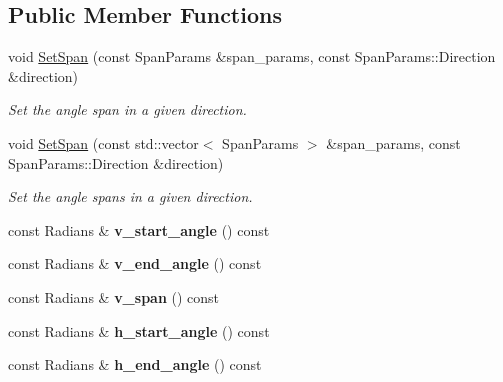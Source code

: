 \subsection*{Public Member Functions}
\begin{DoxyCompactItemize}
\item 
void \hyperlink{classdepth__clustering_1_1ProjectionParams_a0348997a7db34e534270d9a71619b8a9}{Set\+Span} (const Span\+Params \&span\+\_\+params, const Span\+Params\+::\+Direction \&direction)
\begin{DoxyCompactList}\small\item\em Set the angle span in a given direction. \end{DoxyCompactList}\item 
void \hyperlink{classdepth__clustering_1_1ProjectionParams_a6b21f0b17b1b1d38f8cb5b6990b4b0ec}{Set\+Span} (const std\+::vector$<$ Span\+Params $>$ \&span\+\_\+params, const Span\+Params\+::\+Direction \&direction)
\begin{DoxyCompactList}\small\item\em Set the angle spans in a given direction. \end{DoxyCompactList}\item 
\mbox{\label{classdepth__clustering_1_1ProjectionParams_af09fa571e57b30a789f05d1f16f94aaf}} 
const Radians \& {\bfseries v\+\_\+start\+\_\+angle} () const
\item 
\mbox{\label{classdepth__clustering_1_1ProjectionParams_a4075e314684e058cc43ac063a2bb9061}} 
const Radians \& {\bfseries v\+\_\+end\+\_\+angle} () const
\item 
\mbox{\label{classdepth__clustering_1_1ProjectionParams_a43a4f7f3b49eb5071f3c4bc121a0e049}} 
const Radians \& {\bfseries v\+\_\+span} () const
\item 
\mbox{\label{classdepth__clustering_1_1ProjectionParams_a191f8e2bc1f65a7906703979efcf2d91}} 
const Radians \& {\bfseries h\+\_\+start\+\_\+angle} () const
\item 
\mbox{\label{classdepth__clustering_1_1ProjectionParams_acfbdb0fde74b94b1eeef543a8e993028}} 
const Radians \& {\bfseries h\+\_\+end\+\_\+angle} () const

\end{DoxyCompactItemize}
